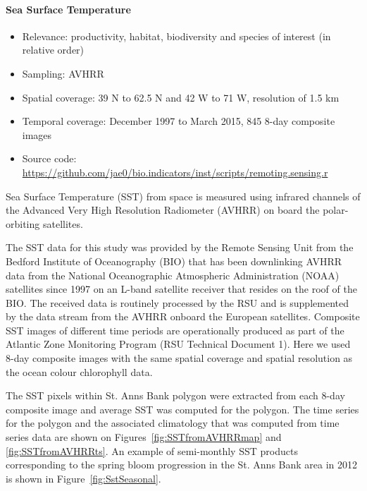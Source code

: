 \documentclass[letterpaper,portrait,11pt]{scrartcl}
\numberwithin{equation}{section}		%
\numberwithin{figure}{section}		%
\numberwithin{table}{section}				%
\begin{document}
\clearpage


\paragraph{Sea Surface Temperature}

\begin{itemize}
  \item Relevance:  productivity, habitat, biodiversity and species of interest (in relative order)
  \item Sampling:  AVHRR
  \item Spatial coverage: 39 N to 62.5 N and 42 W to 71 W, resolution of 1.5 km
  \item Temporal coverage: December 1997 to March 2015, 845 8-day composite images
  \item Source code: \url{https://github.com/jae0/bio.indicators/inst/scripts/remoting.sensing.r}
\end{itemize}

Sea Surface Temperature (SST) from space is measured using infrared channels of the Advanced Very High Resolution Radiometer (AVHRR) on board the polar-orbiting satellites.

The SST data for this study was provided by the Remote Sensing Unit from the Bedford Institute of Oceanography (BIO) that has been downlinking AVHRR data from the National Oceanographic Atmospheric Administration (NOAA) satellites since 1997 on an L-band satellite receiver that resides on the roof of the BIO. The received data is routinely processed by the RSU and is supplemented by the data stream from the AVHRR onboard the European satellites. Composite SST images of different time periods are operationally produced as part of the Atlantic Zone Monitoring Program (RSU Technical Document 1). Here we used 8-day composite images with the same spatial coverage and spatial resolution as the ocean colour chlorophyll data.

The SST pixels within St. Anns Bank polygon were extracted from each 8-day composite image and average SST was computed for the polygon. The time series for the polygon and the associated climatology that was computed from time series data are shown on Figures~\ref{fig:SSTfromAVHRRmap} and \ref{fig:SSTfromAVHRRts}. An example of semi-monthly SST products corresponding to the spring bloom progression in the St. Anns Bank area in 2012 is shown in Figure~\ref{fig:SstSeasonal}.
\end{document}
